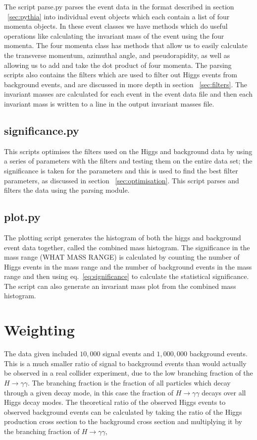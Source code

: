 \documentclass[11pt]{amsart}
\begin{document}
\begin{multicols}{2}
The script parse.py parses the event data in the format described in section ~\ref{sec:pythia} into individual event objects which each contain a list of four momenta objects. In these event classes we have methods which do useful operations like calculating the invariant mass of the event using the four momenta. The four momenta class has methods that allow us to easily calculate the transverse momentum, azimuthal angle, and pseudorapidity, as well as allowing us to add and take the dot product of four momenta. The parsing scripts also contains the filters which are used to filter out Higgs events from background events, and are discussed in more depth in section ~\ref{sec:filters}. The invariant masses are calculated for each event in the event data file and then each invariant mass is written to a line in the output invariant masses file.

\subsection{significance.py}

This scripts optimises the filters used on the Higgs and background data by using a series of parameters with the filters and testing them on the entire data set; the significance is taken for the parameters and this is used to find the best filter parameters, as discussed in section ~\ref{sec:optimisation}. This script parses and filters the data using the parsing module.

\subsection{plot.py}

The plotting script generates the histogram of both the higgs and background event data together, called the combined mass histogram. The significance in the mass range (WHAT MASS RANGE) is calculated by counting the number of Higgs events in the mass range and the number of background events in the mass range and then using eq.~\ref{eq:significance} to calculate the statistical significance. The script can also generate an invariant mass plot from the combined mass histogram.

\section{Weighting}

The data given included $10,000$ signal events and $1,000,000$ background events. This is a much smaller ratio of signal to background events than would actually be observed in a real collider experiment, due to the low branching fraction of the $H \to \gamma\gamma$. The branching fraction is the fraction of all particles which decay through a given decay mode, in this case the fraction of $H \to \gamma\gamma$ decays over all Higgs decay modes. The theoretical ratio of the observed Higgs events to observed background events can be calculated by taking the ratio of the Higgs production cross section to the background cross section and multiplying it by the branching fraction of $H \to \gamma\gamma$,


\end{multicols}
\end{document}
